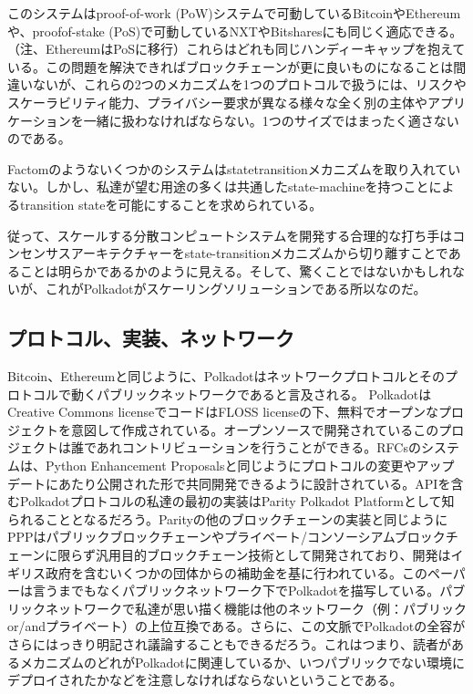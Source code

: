 このシステムはproof-of-work
(PoW)システムで可動しているBitcoinやEthereumや、proofof-stake
(PoS)で可動しているNXTやBitsharesにも同じく適応できる。（注、EthereumはPoSに移行）これらはどれも同じハンディーキャップを抱えている。この問題を解決できればブロックチェーンが更に良いものになることは間違いないが、これらの2つのメカニズムを1つのプロトコルで扱うには、リスクやスケーラビリティ能力、プライバシー要求が異なる様々な全く別の主体やアプリケーションを一緒に扱わなければならない。1つのサイズではまったく適さないのである。

Factomのようないくつかのシステムはstatetransitionメカニズムを取り入れていない。しかし、私達が望む用途の多くは共通したstate-machineを持つことによるtransition
stateを可能にすることを求められている。

従って、スケールする分散コンピュートシステムを開発する合理的な打ち手はコンセンサスアーキテクチャーをstate-transitionメカニズムから切り離すことであることは明らかであるかのように見える。そして、驚くことではないかもしれないが、これがPolkadotがスケーリングソリューションである所以なのだ。

\hypertarget{ux30d7ux30edux30c8ux30b3ux30ebux5b9fux88c5ux30cdux30c3ux30c8ux30efux30fcux30af}{%
\subsection{プロトコル、実装、ネットワーク}\label{ux30d7ux30edux30c8ux30b3ux30ebux5b9fux88c5ux30cdux30c3ux30c8ux30efux30fcux30af}}

Bitcoin、Ethereumと同じように、Polkadotはネットワークプロトコルとそのプロトコルで動くパブリックネットワークであると言及される。
PolkadotはCreative Commons licenseでコードはFLOSS
licenseの下、無料でオープンなプロジェクトを意図して作成されている。オープンソースで開発されているこのプロジェクトは誰であれコントリビューションを行うことができる。RFCsのシステムは、Python
Enhancement
Proposalsと同じようにプロトコルの変更やアップデートにあたり公開された形で共同開発できるように設計されている。APIを含むPolkadotプロトコルの私達の最初の実装はParity
Polkadot
Platformとして知られることとなるだろう。Parityの他のブロックチェーンの実装と同じようにPPPはパブリックブロックチェーンやプライベート/コンソーシアムブロックチェーンに限らず汎用目的ブロックチェーン技術として開発されており、開発はイギリス政府を含むいくつかの団体からの補助金を基に行われている。このペーパーは言うまでもなくパブリックネットワーク下でPolkadotを描写している。パブリックネットワークで私達が思い描く機能は他のネットワーク（例：パブリックor/andプライベート）の上位互換である。さらに、この文脈でPolkadotの全容がさらにはっきり明記され議論することもできるだろう。これはつまり、読者があるメカニズムのどれがPolkadotに関連しているか、いつパブリックでない環境にデプロイされたかなどを注意しなければならないということである。

